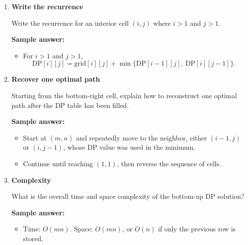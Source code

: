 \documentclass[11pt]{article}
\begin{document}
\begin{enumerate}[leftmargin=0pt, itemindent=1.7em, itemsep=1.2em]
\item \textbf{Write the recurrence}

Write the recurrence for an interior cell $(i,j)$ where $i>1$ and $j>1$.

\vspace{3.2cm}

\ifanswers
\textbf{Sample answer:}
\begin{itemize}
	\item For $i>1$ and $j>1$,
	\[
	\mathrm{DP}[i][j]=\mathrm{grid}[i][j]+\min\{\mathrm{DP}[i-1][j],\ \mathrm{DP}[i][j-1]\}.
	\]
\end{itemize}
\fi

\item \textbf{Recover one optimal path}

Starting from the bottom-right cell, explain how to reconstruct one optimal path after the DP table has been filled.

\vspace{2.3cm}

\ifanswers
\textbf{Sample answer:}
\begin{itemize}
	\item Start at $(m,n)$ and repeatedly move to the neighbor, either $(i-1,j)$ or $(i,j-1)$, whose DP value was used in the minimum.
	\item Continue until reaching $(1,1)$, then reverse the sequence of cells.
\end{itemize}
\fi

\item \textbf{Complexity}

What is the overall time and space complexity of the bottom-up DP solution?

\vspace{1.0cm}

\ifanswers
\textbf{Sample answer:}
\begin{itemize}
	\item Time: $O(mn)$. Space: $O(mn)$, or $O(n)$ if only the previous row is stored.
\end{itemize}
\fi

\end{enumerate}
\end{document}
